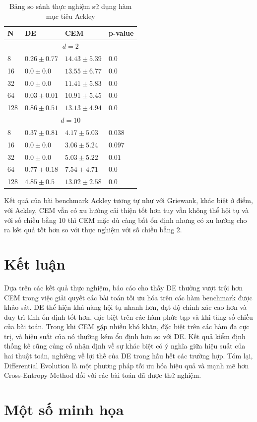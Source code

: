 \documentclass[10pt]{report}
\begin{document}
\begin{table}[H]\centering
	\caption{Bảng so sánh thực nghiệm sử dụng hàm mục tiêu Ackley}
	\begin{tabularx}{0.8\textwidth}{p{5em}XXl}
		\toprule
		\textbf{N} & \textbf{DE}                & \textbf{CEM}       & \textbf{p-value}   \\
		\midrule
		\multicolumn{4}{c}{\(d = 2\)}                                                     \\
		\midrule
		8          & \(\mathbf{0.26 \pm 0.77}\) & \(14.43 \pm 5.39\) & \(\mathbf{0.0}\)   \\
		16         & \(\mathbf{0.0 \pm 0.0}\)   & \(13.55 \pm 6.77\) & \(\mathbf{0.0}\)   \\
		32         & \(\mathbf{0.0 \pm 0.0}\)   & \(11.41 \pm 5.83\) & \(\mathbf{0.0}\)   \\
		64         & \(\mathbf{0.03 \pm 0.01}\) & \(10.91 \pm 5.45\) & \(\mathbf{0.0}\)   \\
		128        & \(\mathbf{0.86 \pm 0.51}\) & \(13.13 \pm 4.94\) & \(\mathbf{0.0}\)   \\
		\midrule
		\multicolumn{4}{c}{\(d = 10\)}                                                    \\
		\midrule
		8          & \(\mathbf{0.37 \pm 0.81}\) & \(4.17 \pm 5.03\)  & \(\mathbf{0.038}\) \\
		16         & \(\mathbf{0.0 \pm 0.0}\)   & \(3.06 \pm 5.24\)  & \(0.097\)          \\
		32         & \(\mathbf{0.0 \pm 0.0}\)   & \(5.03 \pm 5.22\)  & \(\mathbf{0.01}\)  \\
		64         & \(\mathbf{0.77 \pm 0.18}\) & \(7.54 \pm 4.71\)  & \(\mathbf{0.0}\)   \\
		128        & \(\mathbf{4.85 \pm 0.5}\)  & \(13.02 \pm 2.58\) & \(\mathbf{0.0}\)   \\
		\bottomrule
	\end{tabularx}
\end{table}

Kết quả của bài benchmark Ackley tương tự như với Griewank, khác biệt ở điểm, với Ackley, CEM vẫn có xu hướng cải thiện tốt hơn tuy vẫn không thể hội tụ và với số chiều bằng 10 thì CEM mặc dù càng bất ổn định nhưng có xu hướng cho ra kết quả tốt hơn so với thực nghiệm với số chiều bằng 2.

\chapter{Kết luận}
Dựa trên các kết quả thực nghiệm, báo cáo cho thấy DE thường vượt trội hơn CEM trong việc giải quyết các bài toán tối ưu hóa trên các hàm benchmark được khảo sát. DE thể hiện khả năng hội tụ nhanh hơn, đạt độ chính xác cao hơn và duy trì tính ổn định tốt hơn, đặc biệt trên các hàm phức tạp và khi tăng số chiều của bài toán. Trong khi CEM gặp nhiều khó khăn, đặc biệt trên các hàm đa cực trị, và hiệu suất của nó thường kém ổn định hơn so với DE. Kết quả kiểm định thống kê cũng củng cố nhận định về sự khác biệt có ý nghĩa giữa hiệu suất của hai thuật toán, nghiêng về lợi thế của DE trong hầu hết các trường hợp. Tóm lại, Differential Evolution là một phương pháp tối ưu hóa hiệu quả và mạnh mẽ hơn Cross-Entropy Method đối với các bài toán đã được thử nghiệm.

\chapter{Một số minh họa}
\end{document}
